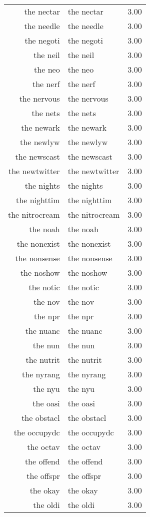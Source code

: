 \begin{table}[ht]
\begin{tabular}{rlr}
  the nectar & the nectar & 3.00 \\ 
  the needle & the needle & 3.00 \\ 
  the negoti & the negoti & 3.00 \\ 
  the neil & the neil & 3.00 \\ 
  the neo & the neo & 3.00 \\ 
  the nerf & the nerf & 3.00 \\ 
  the nervous & the nervous & 3.00 \\ 
  the nets & the nets & 3.00 \\ 
  the newark & the newark & 3.00 \\ 
  the newlyw & the newlyw & 3.00 \\ 
  the newscast & the newscast & 3.00 \\ 
  the newtwitter & the newtwitter & 3.00 \\ 
  the nights & the nights & 3.00 \\ 
  the nighttim & the nighttim & 3.00 \\ 
  the nitrocream & the nitrocream & 3.00 \\ 
  the noah & the noah & 3.00 \\ 
  the nonexist & the nonexist & 3.00 \\ 
  the nonsense & the nonsense & 3.00 \\ 
  the noshow & the noshow & 3.00 \\ 
  the notic & the notic & 3.00 \\ 
  the nov & the nov & 3.00 \\ 
  the npr & the npr & 3.00 \\ 
  the nuanc & the nuanc & 3.00 \\ 
  the nun & the nun & 3.00 \\ 
  the nutrit & the nutrit & 3.00 \\ 
  the nyrang & the nyrang & 3.00 \\ 
  the nyu & the nyu & 3.00 \\ 
  the oasi & the oasi & 3.00 \\ 
  the obstacl & the obstacl & 3.00 \\ 
  the occupydc & the occupydc & 3.00 \\ 
  the octav & the octav & 3.00 \\ 
  the offend & the offend & 3.00 \\ 
  the offspr & the offspr & 3.00 \\ 
  the okay & the okay & 3.00 \\ 
  the oldi & the oldi & 3.00 \\ 

\end{tabular}
\end{table}
